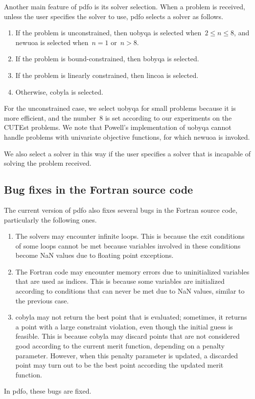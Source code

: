 Another main feature of \gls{pdfo} is its solver selection.
When a problem is received, unless the user specifies the solver to use, \gls{pdfo} selects a solver as follows.
\begin{enumerate}
    \item If the problem is unconstrained, then \gls{uobyqa} is selected when~$2 \le n \le 8$, and \gls{newuoa} is selected when~$n = 1$ or~$n > 8$.
    \item If the problem is bound-constrained, then \gls{bobyqa} is selected.
    \item If the problem is linearly constrained, then \gls{lincoa} is selected.
    \item Otherwise, \gls{cobyla} is selected.
\end{enumerate}

For the unconstrained case, we select \gls{uobyqa} for small problems because it is more efficient, and the number~$8$ is set according to our experiments on the CUTEst problems.
We note that Powell's implementation of \gls{uobyqa} cannot handle problems with univariate objective functions, for which \gls{newuoa} is invoked.

We also select a solver in this way if the user specifies a solver that is incapable of solving the problem received.

\subsection{Bug fixes in the Fortran source code}
\label{subsec:bug-corrections}

The current version of \gls{pdfo} also fixes several bugs in the Fortran source code, particularly the following ones.
\begin{enumerate}
    \item The solvers may encounter infinite loops.
    This is because the exit conditions of some loops cannot be met because variables involved in these conditions become NaN values due to floating point exceptions.
    \item The Fortran code may encounter memory errors due to uninitialized variables that are used as indices.
    This is because some variables are initialized according to conditions that can never be met due to NaN values, similar to the previous case.
    \item \Gls{cobyla} may not return the best point that is evaluated; sometimes, it returns a point with a large constraint violation, even though the initial guess is feasible.
    This is because \gls{cobyla} may discard points that are not considered good according to the current merit function, depending on a penalty parameter.
    However, when this penalty parameter is updated, a discarded point may turn out to be the best point according the updated merit function.
\end{enumerate}
In \gls{pdfo}, these bugs are fixed.

